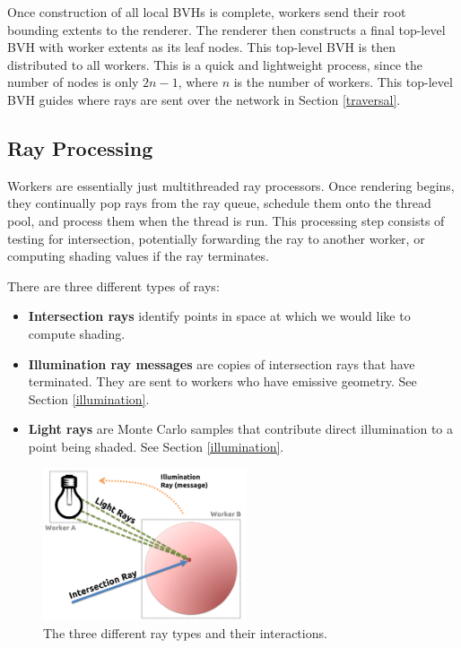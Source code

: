 \documentclass[a4paper,twoside]{article}
\begin{document}
Once construction of all local BVHs is complete, workers send their root
bounding extents to the renderer. The renderer then constructs a final top-level
BVH with worker extents as its leaf nodes. This top-level BVH is then distributed
to all workers. This is a quick and lightweight process, since the number of nodes
is only $2n - 1$, where $n$ is the number of workers. This top-level BVH guides
where rays are sent over the network in Section \ref{traversal}.

\subsection{Ray Processing}
\label{process}

Workers are essentially just multithreaded ray processors. Once rendering begins,
they continually pop rays from the ray queue, schedule them onto the thread pool,
and process them when the thread is run. This processing step consists of
testing for intersection, potentially forwarding the ray to another worker,
or computing shading values if the ray terminates.

There are three different types of rays:

\begin{itemize}
    \item \textbf{Intersection rays} identify points in space at which we would
        like to compute shading.
    \item \textbf{Illumination ray messages} are copies of intersection rays that
        have terminated. They are sent to workers who have emissive geometry.
        See Section \ref{illumination}.
    \item \textbf{Light rays} are Monte Carlo samples that contribute direct
        illumination to a point being shaded. See Section \ref{illumination}.
\end{itemize}

\begin{figure}[h!]
    \centering
    \includegraphics[width=60mm]{figures/raytypes.png}
    \caption{The three different ray types and their interactions.}
    \label{fig:raytypes}
\end{figure}
\end{document}
